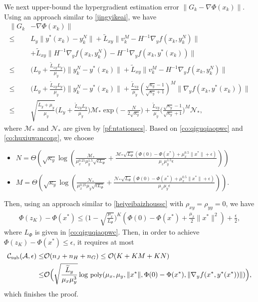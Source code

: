 \documentclass{osudissert96}
\begin{document}
We next upper-bound the hypergradient estimation error $\|G_k-\nabla \Phi(x_k)\|$. Using an approach similar to \cref{jingyikeai}, we have 
\begin{align}\label{co:huxiuwancong}
\|G_k&-\nabla \Phi(x_k)\| \nonumber
\\\leq & L_y \|y^*(x_k)-y_k^N\| + \widetilde L_{xy} \|v_k^M- H^{-1}\nabla_y f( x_k,y^N_k) \| \nonumber
\\&+ \widetilde L_{xy}\big\|H^{-1}\nabla_y f( x_k,y^N_k)-H^{-1}\nabla_y f(x_k,y^*(x_k)) \big\|\nonumber
\\\leq & \Big(L_y +\frac{\widetilde L_{xy}L_y}{\mu_y} \Big)\|y_k^N-y^*(x_k)\| + \widetilde L_{xy} \|v_k^M- H^{-1}\nabla_y f( x_k,y^N_k) \|  \nonumber
\\\leq& \Big(L_y +\frac{\widetilde L_{xy}L_y}{\mu_y} \Big)\|y_k^N-y^*(x_k)\|+\frac{\widetilde L_{xy}}{\mu_y}\left(\frac{\sqrt{\kappa_y}-1}{\sqrt{\kappa_y}+1}\right)^M\|\nabla_y f( x_k,y^*(x_k))\| \nonumber
\\\leq &\sqrt{\frac{\widetilde L_y +\mu_y}{\mu_y}} \Big(L_y +\frac{\widetilde L_{xy}L_y}{\mu_y}\Big) \mathcal{M}_* \exp\Big(-\frac{N}{2\sqrt{\kappa_y}}\Big) +\frac{\widetilde L_{xy}}{\mu_y}\Big(\frac{\sqrt{\kappa_y}-1}{\sqrt{\kappa_y}+1}\Big)^M\mathcal{N}_*,
\end{align}
where $\mathcal{M}_*$ and $\mathcal{N}_*$ are given by \cref{pf:ntationscs}. 
Based on \cref{co:qiguqiaopwc} and \cref{co:huxiuwancong}, we choose
\begin{itemize}
\item $N=\Theta(\sqrt{\kappa_y}\log (\frac{\mathcal{M}_*}{\mu_x^{0.25}\mu_y^{1.5}\sqrt{\epsilon L_\Phi}}+\frac{\mathcal{M}_*\sqrt{L_\Phi}(\Phi(0) -\Phi(x^*)+\mu_x^{0.5}\|x^*\|+\epsilon)}{\mu_x\mu_y^{1.5}\epsilon}))$
\item $M=\Theta(\sqrt{\kappa_y}\log (\frac{\mathcal{N}_*}{\mu_x^{0.25}\mu_y\sqrt{\epsilon L_\Phi}}+\frac{\mathcal{N}_*\sqrt{L_\Phi}(\Phi(0) -\Phi(x^*)+\mu_x^{0.5}\|x^*\|+\epsilon)}{\mu_x\mu_y\epsilon})).$
\end{itemize} 
Then, using an approach similar to \cref{heiyeibaizhoussc} with $\rho_{xy}=\rho_{yy}=0$, we have 
\begin{align}
\Phi(z_K)- \Phi(x^*) \leq \Big(1 -\sqrt{\frac{\mu_x}{L_\Phi}} \Big)^{K}(\Phi(0) -\Phi(x^*)+\frac{\mu_x}{2} \|x^*\|^2) +\frac{\epsilon}{2},
\end{align}
where $L_\Phi$ is given in \cref{co:qiguqiaopwc}. Then, in order to achieve $\Phi(z_K)- \Phi(x^*) \leq \epsilon$, it requires at most 
\begin{align*}
\mathcal{C}_{\text{\normalfont sub}}(\mathcal{A},\epsilon) \leq &\mathcal{O}(n_J+n_H + n_G)\leq \mathcal{O}(K+KM+KN)   \nonumber
\\\leq& \mathcal{O}\Big(\sqrt{\frac{\widetilde L_y}{\mu_x\mu_y^3}}\log\, {\small \text{poly}(\mu_x,\mu_y,\|x^*\|,\Phi(0)-\Phi(x^*),\|\nabla_y f(x^*,y^*(x^*))\|)}\Big),
\end{align*}
which finishes the proof. 
\end{document}
